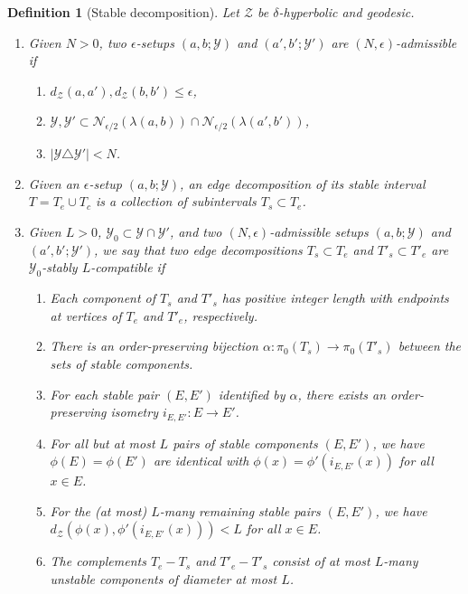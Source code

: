 \documentclass[10pt,a4paper]{amsart}
\newtheorem{definition}{Definition}
\newcommand{\calN}{\mathcal{N}}
\newcommand{\calY}{\mathcal{Y}}
\newcommand{\calZ}{\mathcal{Z}}
\begin{document}
\begin{definition}[Stable decomposition] \label{defn:stable decomp}
Let $\calZ$ be $\delta$-hyperbolic and geodesic.  
\begin{enumerate}
\item Given $N>0$, two $\epsilon$-setups $(a,b; \calY)$ and $(a',b'; \calY')$ are $(N,\epsilon)$-\emph{admissible} if
\begin{enumerate}
\item $d_{\calZ}(a,a'), d_{\calZ}(b,b') \leq \epsilon$,
\item $\calY, \calY' \subset \calN_{\epsilon/2}(\lambda(a,b)) \cap \calN_{\epsilon/2}(\lambda(a',b'))$,
\item $|\calY \triangle \calY'| < N$.
\end{enumerate}
\item Given an $\epsilon$-setup $(a,b;\calY)$, an \emph{edge decomposition} of its stable interval $T = T_e \cup T_c$ is a collection of subintervals $T_s \subset T_e$.
\item Given $L>0$, $\calY_0 \subset \calY \cap \calY'$, and two $(N,\epsilon)$-admissible setups $(a,b;\calY)$ and $(a',b'; \calY')$, we say that two edge decompositions $T_s \subset T_e$ and $T'_s \subset T'_e$ are $\calY_0$-\emph{stably} $L$-\emph{compatible} if
\begin{enumerate}
\item Each component of $T_s$ and $T'_s$ has positive integer length with endpoints at vertices of $T_e$ and $T'_e$, respectively. \label{item:integer length}
\item There is an order-preserving bijection $\alpha:\pi_0(T_s) \to \pi_0(T'_s)$ between the sets of stable components. \label{item:stable bijection}
\item For each \emph{stable pair} $(E, E')$ identified by $\alpha$, there exists an order-preserving isometry $i_{E,E'}:E \to E'$. \label{item:stable pairs}
\item For all but at most $L$ pairs of stable components $(E,E')$, we have $\phi(E) = \phi(E')$ are identical with $\phi(x) = \phi'(i_{E,E'}(x))$ for all $x \in E$. \label{item:identical pairs}
\item For the (at most) $L$-many remaining stable pairs $(E,E')$, we have $d_{\calZ}(\phi(x), \phi'(i_{E,E'}(x)))< L$ for all $x \in E$. \label{item:close pairs}
\item The complements $T_{e} - T_s$ and $T'_{e} - T'_s$ consist of at most $L$-many \emph{unstable components} of diameter at most $L$.\label{item:unstable components}

\end{enumerate}
\end{enumerate}
\end{definition}
\end{document}

